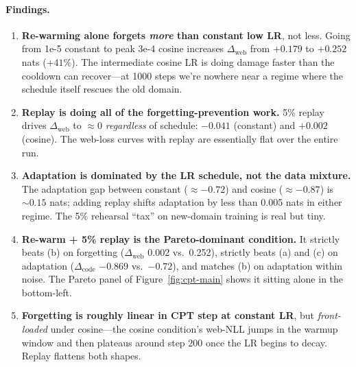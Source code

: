 \documentclass[10pt,letterpaper]{article}
\begin{document}
\paragraph{Findings.}
\begin{enumerate}[leftmargin=1.4em,itemsep=2pt]
  \item \textbf{Re-warming alone forgets \emph{more} than constant low LR}, not less. Going from 1e-5 constant to peak 3e-4 cosine increases $\Delta_{\text{web}}$ from $+0.179$ to $+0.252$ nats ($+41\%$). The intermediate cosine LR is doing damage faster than the cooldown can recover---at 1000 steps we're nowhere near a regime where the schedule itself rescues the old domain.
  \item \textbf{Replay is doing all of the forgetting-prevention work.} 5\% replay drives $\Delta_{\text{web}}$ to $\approx 0$ \emph{regardless} of schedule: $-0.041$ (constant) and $+0.002$ (cosine). The web-loss curves with replay are essentially flat over the entire run.
  \item \textbf{Adaptation is dominated by the LR schedule, not the data mixture.} The adaptation gap between constant ($\approx -0.72$) and cosine ($\approx -0.87$) is $\sim 0.15$ nats; adding replay shifts adaptation by less than 0.005 nats in either regime. The 5\% rehearsal ``tax'' on new-domain training is real but tiny.
  \item \textbf{Re-warm + 5\% replay is the Pareto-dominant condition.} It strictly beats (b) on forgetting ($\Delta_{\text{web}}$ 0.002 vs.\ 0.252), strictly beats (a) and (c) on adaptation ($\Delta_{\text{code}}$ $-0.869$ vs.\ $-0.72$), and matches (b) on adaptation within noise. The Pareto panel of Figure~\ref{fig:cpt-main} shows it sitting alone in the bottom-left.
  \item \textbf{Forgetting is roughly linear in CPT step at constant LR}, but \emph{front-loaded} under cosine---the cosine condition's web-NLL jumps in the warmup window and then plateaus around step 200 once the LR begins to decay. Replay flattens both shapes.
\end{enumerate}
\end{document}
